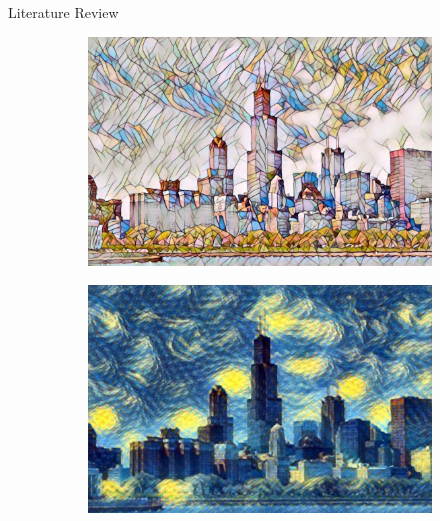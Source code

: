 \documentclass{beamer}
\begin{document}
\begin{frame}[allowframebreaks]{Literature Review}
\begin{figure}[H]
\begin{subfigure}[b]{.45\textwidth}
        \end{subfigure}
        \begin{subfigure}[b]{.45\textwidth}
            \includegraphics[width=\textwidth]{img/fast-neural-style/chicago_mosaic.jpg}
        \end{subfigure}
        \begin{subfigure}[b]{.45\textwidth}
            \includegraphics[width=\textwidth]{img/fast-neural-style/chicago_starry_night.jpg}
        \end{subfigure}
        \caption*{}
    \end{figure}
\end{frame}
\end{document}
